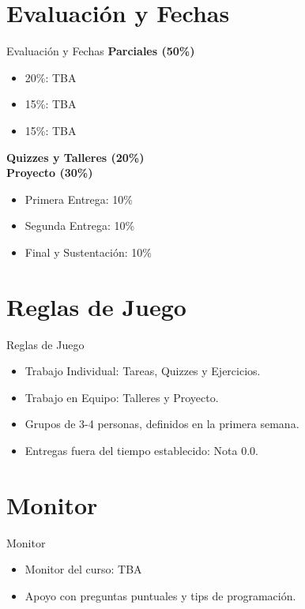 \documentclass{beamer}
\begin{document}
\section{Evaluación y Fechas}

\begin{frame}{Evaluación y Fechas}
\textbf{Parciales (50\%)} 
\begin{itemize}
    \item 20\%: TBA
    \item 15\%: TBA
    \item 15\%: TBA
\end{itemize}
\textbf{Quizzes y Talleres (20\%)} \\
\textbf{Proyecto (30\%)} 
\begin{itemize}
    \item Primera Entrega: 10\%
    \item Segunda Entrega: 10\%
    \item Final y Sustentación: 10\%
\end{itemize}
\end{frame}

\section{Reglas de Juego}

\begin{frame}{Reglas de Juego}
\begin{itemize}
    \item Trabajo Individual: Tareas, Quizzes y Ejercicios.
    \item Trabajo en Equipo: Talleres y Proyecto.
    \item Grupos de 3-4 personas, definidos en la primera semana.
    \item Entregas fuera del tiempo establecido: Nota 0.0.
\end{itemize}
\end{frame}

\section{Monitor}

\begin{frame}{Monitor}
\begin{itemize}
    \item Monitor del curso: TBA
    \item Apoyo con preguntas puntuales y tips de programación.
\end{itemize}
\end{frame}
\end{document}
